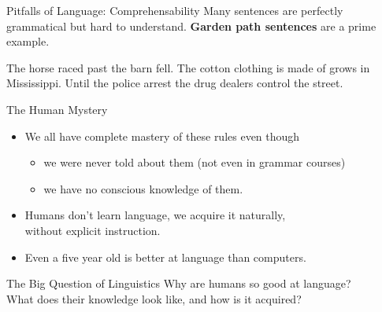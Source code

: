 \documentclass[xcolor={usenames,svgnames,x11names,dvipsnames,table}]{beamer}
\begin{document}
\begin{frame}{Pitfalls of Language: Comprehensability}
    Many sentences are perfectly grammatical but hard to understand.
    \textbf{Garden path sentences} are a prime example.
    \begin{exe}
        \small
        \ex
        \begin{xlist}
            \ex The horse raced past the barn fell.
            \pause
            \ex The cotton clothing is made of grows in Mississippi.
            \pause
            \ex Until the police arrest the drug dealers control the street.
        \end{xlist}
    \end{exe}
\end{frame}

\begin{frame}{The Human Mystery}
    \begin{itemize}
        \item We all have complete mastery of these rules even though
            \begin{itemize}
                \item we were never told about them (not even in grammar courses)
                \item we have no conscious knowledge of them.
            \end{itemize}
        \item Humans don't learn language, we acquire it naturally,\\
            without explicit instruction.
        \item Even a five year old is better at language than computers. 
    \end{itemize}

    \pause
    \begin{block}{The Big Question of Linguistics}
        Why are humans so good at language?\\
        What does their knowledge look like, and how is it acquired?
    \end{block}
\end{frame}
\end{document}
